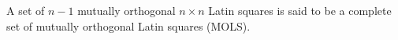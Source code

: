 A set of $n-1$ mutually orthogonal $n \times n$ Latin squares is said to be a complete set of mutually orthogonal Latin squares (MOLS).
